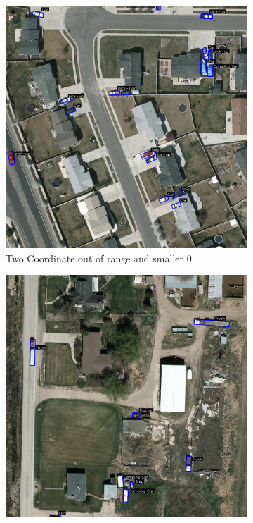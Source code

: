 \begin{figure}[h]
    \centering
    \begin{subfigure}[b]{0.45\textwidth}
        \centering
        \includegraphics[trim={600pt 1000pt 350pt 0pt},clip,width=\textwidth]{images/bb_smaller0.png}
        \caption{Two Coordinate out of range and smaller 0}
        \label{fig:smaller0}
    \end{subfigure}
    \hfill
    \begin{subfigure}[b]{0.45\textwidth}
        \centering
        \includegraphics[trim={180pt 0pt 750pt 993pt},clip,width=\textwidth]{images/bb_higher1.png}

\end{subfigure}
\end{figure}
